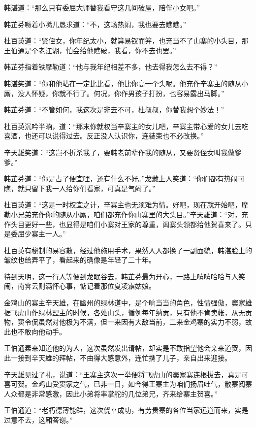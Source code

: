 \documentclass[12pt,oneside]{book}
\begin{document}
韩湛道：``那么只有委屈大师替我看守这几间破屋，陪伴小女吧。''

韩芷芬噘着小嘴儿恳求道：``不，这场热闹，我也要去瞧瞧。''

杜百英道：``贤侄女，你年纪太小，就算易钗而笄，也充当不了山寨的小头目，那王伯通是个老江湖，怕会给他瞧破，我看，你不去也罢。''

韩芷芬指着铁摩勒道：``他与我年纪相差不多，他去得我怎么去不得？''

韩湛笑道：``你和他站在一定比比看，他比你高一个头呢。他充作辛寨主的随从小厮，没人怀疑，你就不行了。何况，你作男孩子打扮，也容易露出马脚。''

韩芷芬道：``不管如何，我这次是非去不可，杜叔叔，你替我想个妙法！''

杜百英沉吟半晌，道：``那末你就权当辛寨主的女儿吧，辛寨主带心爱的女儿去吃喜酒，也还可以说得过去。反正没人认识你，连装束也不必改换。''

辛天雄笑道：``这岂不折杀我了，要韩老前辈作我的随从，又要贤侄女叫我做爹爹。''

韩芷芬道：``你是占了便宜哩，还有什么不好。''龙藏上人笑道：``你们都有热闹可瞧，就只留下我一人给你们看家，可真是气闷了。''

杜百英道：``这是一时权宜之计，辛寨主也无须难为情。好吧，现在就开始吧，摩勒小兄弟充作你的随从小厮，咱们都充作你山寨里的大头目。''辛天雄道：``对，充作头目更好一些，也显得是咱们小寨对王家的尊重，阖寨头领都给他贺喜来了。只是委屈少寨主一人。''

杜百英有秘制的易容散，经过他施用手术，果然人人都换了一副面貌，韩湛脸上的皱纹也给弄平了，看起来的确像是年轻了二十年。

待到天明，这一行人等便到龙眠谷去，韩芷芬最为开心，一路上嘻嘻哈哈与人笑闹，南霁云则满怀心事，惦记着那位夏凌霜姑娘。

金鸡山的寨主辛天雄，在幽州的绿林道中，是个响当当的角色，性情强傲，窦家雄据飞虎山作绿林盟主的时候，各处山头，循例每年纳贡，只有他不肯卖帐，从无贡物，窦令侃虽然对他极为不满，但一来因有大敌当前，二来金鸡寨的实力不弱，故此也不敢向他动手。

王伯通素来知道他的为人，这次虽然发出请帖，却实是不敢指望他会亲来道贺，因此一接到辛天雄的拜帖，不由得大感意外，连忙携了儿子，亲自出来迎接。

辛天雄见过了礼，说道：``王寨主这次一举便将飞虎山的窦家寨连根拔去，真是可喜可贺。金鸡山受窦家之气，已非一日，如今得王寨主为咱们扬眉吐气，敝寨阅寨人众都是非常感激，因此小弟将率掌舵的几位弟兄，齐来给寨主贺喜。''

王伯通道：``老朽德薄能鲜，这次侥幸成功，有劳贵寨的各位当家远道而来，实是过意不去，这厢答谢。''
\end{document}
